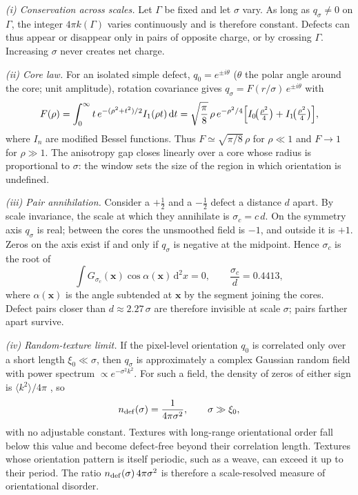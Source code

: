 \documentclass[11pt,a4paper]{article}
\newcommand{\dd}{\mathrm{d}}
\begin{document}
\emph{(i) Conservation across scales.} Let $\Gamma$ be fixed and let $\sigma$ vary. As long as $q_\sigma\neq0$ on $\Gamma$, the integer $4\pi k(\Gamma)$ varies continuously and is therefore constant. Defects can thus appear or disappear only in pairs of opposite charge, or by crossing $\Gamma$. Increasing $\sigma$ never creates net charge.

\emph{(ii) Core law.} For an isolated simple defect, $q_0=e^{\pm i\theta}$ ($\theta$ the polar angle around the core; unit amplitude), rotation covariance gives $q_\sigma=F(r/\sigma)\,e^{\pm i\theta}$ with
\begin{equation}
 F(\rho)=\int_0^\infty t\,e^{-(\rho^2+t^2)/2}I_1(\rho t)\,\dd t
 =\sqrt{\frac\pi8}\,\rho\,e^{-\rho^2/4}\Bigl[I_0\!\bigl(\tfrac{\rho^2}4\bigr)+I_1\!\bigl(\tfrac{\rho^2}4\bigr)\Bigr],
 \label{eq:core}
\end{equation}
where $I_n$ are modified Bessel functions. Thus $F\simeq\sqrt{\pi/8}\,\rho$ for $\rho\ll1$ and $F\to1$ for $\rho\gg1$. The anisotropy gap closes linearly over a core whose radius is proportional to $\sigma$: the window sets the size of the region in which orientation is undefined.

\emph{(iii) Pair annihilation.} Consider a $+\tfrac12$ and a $-\tfrac12$ defect a distance $d$ apart. By scale invariance, the scale at which they annihilate is $\sigma_c=c\,d$. On the symmetry axis $q_\sigma$ is real; between the cores the unsmoothed field is $-1$, and outside it is $+1$. Zeros on the axis exist if and only if $q_\sigma$ is negative at the midpoint. Hence $\sigma_c$ is the root of
\begin{equation}
 \int G_{\sigma_c}(\bm x)\cos\alpha(\bm x)\,\dd^2x=0,\qquad \frac{\sigma_c}{d}=0.4413,
 \label{eq:annihilation}
\end{equation}
where $\alpha(\bm x)$ is the angle subtended at $\bm x$ by the segment joining the cores. Defect pairs closer than $d\approx2.27\,\sigma$ are therefore invisible at scale $\sigma$; pairs farther apart survive.

\emph{(iv) Random-texture limit.} If the pixel-level orientation $q_0$ is correlated only over a short length $\xi_0\ll\sigma$, then $q_\sigma$ is approximately a complex Gaussian random field with power spectrum $\propto e^{-\sigma^2k^2}$. For such a field, the density of zeros of either sign is $\langle k^2\rangle/4\pi$ \cite{Berry2000}, so
\begin{equation}
 n_{\rm def}(\sigma)=\frac1{4\pi\sigma^2},\qquad \sigma\gg\xi_0 ,
 \label{eq:randomdensity}
\end{equation}
with no adjustable constant. Textures with long-range orientational order fall below this value and become defect-free beyond their correlation length. Textures whose orientation pattern is itself periodic, such as a weave, can exceed it up to their period. The ratio $n_{\rm def}(\sigma)\,4\pi\sigma^2$ is therefore a scale-resolved measure of orientational disorder.
\end{document}

